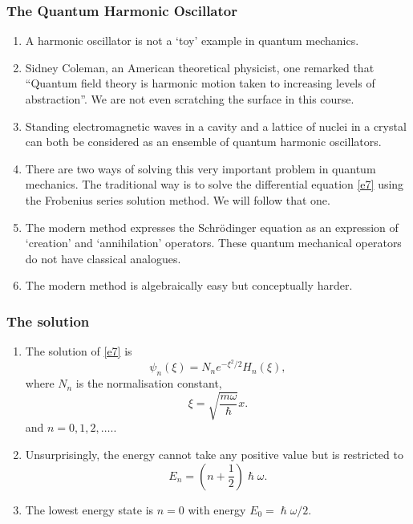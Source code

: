 \documentclass{beamer}
\begin{document}
\begin{frame}
\frametitle{The Quantum Harmonic Oscillator}
\begin{enumerate}
\item A harmonic oscillator is not a `toy' example in quantum mechanics. 
\item Sidney Coleman, an American theoretical physicist, one remarked that 
``Quantum field theory is harmonic motion taken to increasing levels of 
abstraction''. We are not even scratching the surface in this course.
\item Standing electromagnetic waves in a cavity and a lattice of nuclei in a
crystal can both be considered as an ensemble of quantum harmonic oscillators.
\item There are two ways of solving this very important problem in quantum 
mechanics. The traditional way is to solve the differential equation \eqref{e7}
using the Frobenius series solution method. We will follow that one.
\item The modern method expresses the Schr\"{o}dinger equation as an expression
of `creation' and `annihilation' operators. These quantum mechanical operators
do not have classical analogues.
\item The modern method is algebraically easy but conceptually harder.
\end{enumerate}
\end{frame}

\begin{frame}
\frametitle{The solution}
\begin{enumerate}
\item The solution of \eqref{e7} is
\begin{equation}\label{e10}
\psi_n(\xi) = N_ne^{-\xi^2/2}H_n(\xi),
\end{equation}
where $N_n$ is the normalisation constant,
\begin{equation}\label{e11}
\xi = \sqrt{\frac{m\omega}{\hslash}}x.
\end{equation}
and $n = 0, 1, 2, \ldots.$.
\item Unsurprisingly, the energy cannot take any positive value but is 
restricted to
\begin{equation}\label{e12}
E_n = \left(n + \frac{1}{2}\right)\hslash\omega.
\end{equation}
\item The lowest energy state is $n = 0$ with energy $E_0 = \hslash\omega/2$.
\end{enumerate}
\end{frame}
\end{document}
